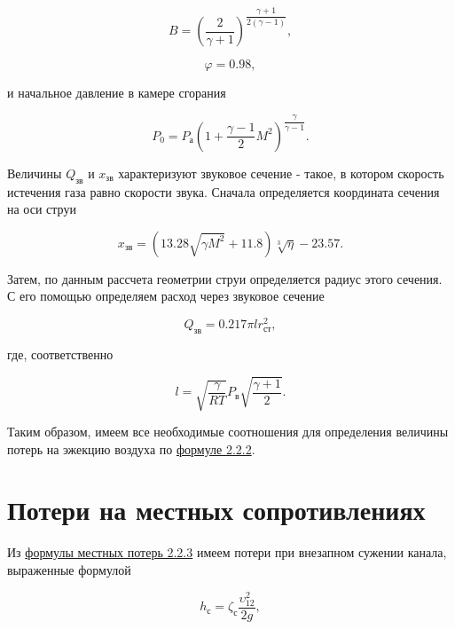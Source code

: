 \begin{equation}
    \label{eqn:LavalKoef2}
    B=(\dfrac{2}{\gamma+1})^{\dfrac{\gamma+1}{2(\gamma-1)}},
\end{equation}

\begin{equation}
    \label{eqn:LavalKoef1}
    \varphi=0.98,
\end{equation}

и начальное давление в камере сгорания

\begin{equation}
    \label{eqn:StartPressure}
    P_\text{0}=P_\text{а}(1+\dfrac{\gamma-1}{2} M^2)^{\dfrac{\gamma}{\gamma-1}}.
\end{equation}

Величины $Q_\text{зв}$ и $x_\text{зв}$ характеризуют звуковое сечение - такое, в котором скорость истечения газа равно скорости звука. Сначала определяется координата сечения на оси струи

\begin{equation}
    \label{eqn:SoundCoord}
    x_\text{зв}=(13.28 \sqrt{\gamma M^2} + 11.8) \sqrt[3]{\eta}-23.57.
\end{equation}

Затем, по данным рассчета геометрии струи определяется радиус этого сечения. С его помощью определяем расход через звуковое сечение

\begin{equation}
    \label{eqn:SoundConsumption}
    Q_\text{зв}=0.217 \pi l r_\text{ст}^2,
\end{equation}

где, соответственно

\begin{equation}
    \label{eqn:SoundVelocity}
    l=\sqrt{\dfrac{\gamma}{RT}} P_\text{в} \sqrt{\dfrac{\gamma+1}{2}}.
\end{equation}

Таким образом, имеем все необходимые соотношения для определения величины потерь на эжекцию воздуха по \hyperref[eqn:EjectionLosses]{формуле 2.2.2}.

\section{Потери на местных сопротивлениях}
Из \hyperref[eqn:LocalLosses]{формулы местных потерь 2.2.3} имеем потери при внезапном сужении канала, выраженные формулой

\begin{equation}
    \label{eqn:ConstrictionLosses}
    h_\text{с}=\zeta_\text{с} \dfrac{\upsilon_{12}^2}{2g},
\end{equation}


